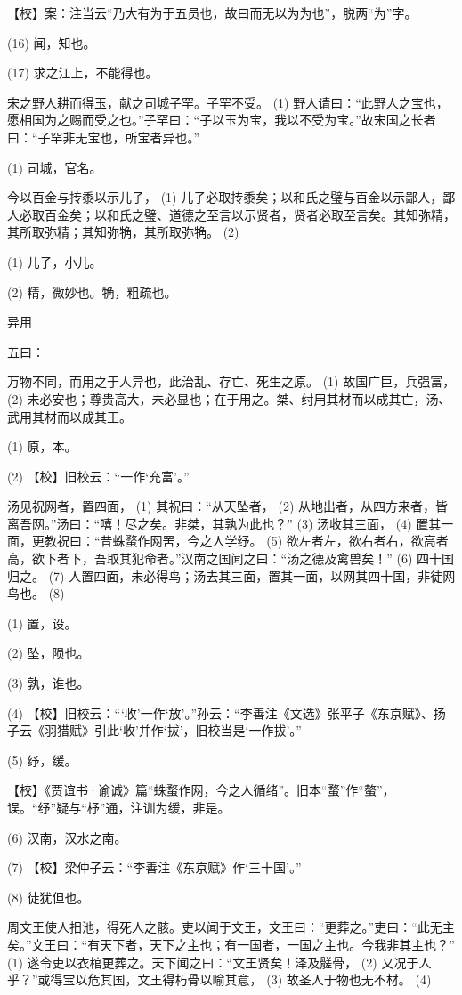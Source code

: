 \documentclass[12pt,UTF8]{ctexbook}
\begin{document}
【校】案：注当云“乃大有为于五员也，故曰而无以为为也”，脱两“为”字。

(16) 闻，知也。

(17) 求之江上，不能得也。

宋之野人耕而得玉，献之司城子罕。子罕不受。 (1) 野人请曰：“此野人之宝也，愿相国为之赐而受之也。”子罕曰：“子以玉为宝，我以不受为宝。”故宋国之长者曰：“子罕非无宝也，所宝者异也。”

(1) 司城，官名。

今以百金与抟黍以示儿子， (1) 儿子必取抟黍矣；以和氏之璧与百金以示鄙人，鄙人必取百金矣；以和氏之璧、道德之至言以示贤者，贤者必取至言矣。其知弥精，其所取弥精；其知弥觕，其所取弥觕。 (2)

(1) 儿子，小儿。

(2) 精，微妙也。觕，粗疏也。





异用


五曰：

万物不同，而用之于人异也，此治乱、存亡、死生之原。 (1) 故国广巨，兵强富， (2) 未必安也；尊贵高大，未必显也；在于用之。桀、纣用其材而以成其亡，汤、武用其材而以成其王。

(1) 原，本。

(2) 【校】旧校云：“一作‘充富’。”

汤见祝网者，置四面， (1) 其祝曰：“从天坠者， (2) 从地出者，从四方来者，皆离吾网。”汤曰：“嘻！尽之矣。非桀，其孰为此也？” (3) 汤收其三面， (4) 置其一面，更教祝曰：“昔蛛蝥作网罟，今之人学纾。 (5) 欲左者左，欲右者右，欲高者高，欲下者下，吾取其犯命者。”汉南之国闻之曰：“汤之德及禽兽矣！” (6) 四十国归之。 (7) 人置四面，未必得鸟；汤去其三面，置其一面，以网其四十国，非徒网鸟也。 (8)

(1) 置，设。

(2) 坠，陨也。

(3) 孰，谁也。

(4) 【校】旧校云：“‘收’一作‘放’。”孙云：“李善注《文选》张平子《东京赋》、扬子云《羽猎赋》引此‘收’并作‘拔’，旧校当是‘一作拔’。”

(5) 纾，缓。

【校】《贾谊书·谕诚》篇“蛛蝥作网，今之人循绪”。旧本“蝥”作“螯”，误。“纾”疑与“杼”通，注训为缓，非是。

(6) 汉南，汉水之南。

(7) 【校】梁仲子云：“李善注《东京赋》作‘三十国’。”

(8) 徒犹但也。

周文王使人抇池，得死人之骸。吏以闻于文王，文王曰：“更葬之。”吏曰：“此无主矣。”文王曰：“有天下者，天下之主也；有一国者，一国之主也。今我非其主也？” (1) 遂令吏以衣棺更葬之。天下闻之曰：“文王贤矣！泽及髊骨， (2) 又况于人乎？”或得宝以危其国，文王得朽骨以喻其意， (3) 故圣人于物也无不材。 (4)
\end{document}
